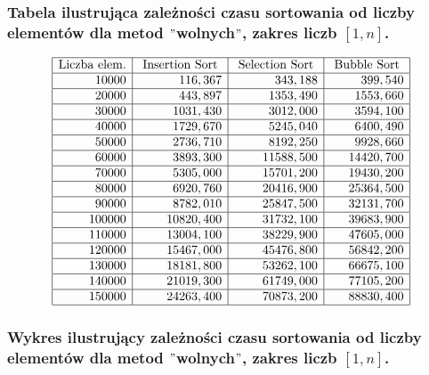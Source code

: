 \documentclass[polish,polish,a4paper]{article}
\begin{document}
\begin{spacing}{1.5}
	\subsubsection*{Tabela ilustrująca zależności czasu sortowania od liczby elementów dla metod $"$wolnych$"$, zakres liczb $ [1,n] $.}
	
	\begin{figure}[H]
			\begin{equation*}
		\begin{array}{|r|r|r|r|}
		\hline
		\multicolumn{1}{|c|}{$Liczba elem.$}&\multicolumn{1}{c|}{$ Insertion Sort $}&\multicolumn{1}{c|}{$ Selection Sort $}&\multicolumn{1}{c|}{$ Bubble Sort $}\\\hline
		10000&	116,367&	343,188&	399,540\\\hline
		20000&	443,897&	1353,490&	1553,660\\\hline
		30000&	1031,430&	3012,000&	3594,100\\\hline
		40000&	1729,670&	5245,040&	6400,490\\\hline
		50000&	2736,710&	8192,250&	9928,660\\\hline
		60000&	3893,300&	11588,500&	14420,700\\\hline
		70000&	5305,000&	15701,200&	19430,200\\\hline
		80000&	6920,760&	20416,900&	25364,500\\\hline
		90000&	8782,010&	25847,500&	32131,700\\\hline
		100000&	10820,400&	31732,100&	39683,900\\\hline
		110000&	13004,100&	38229,900&	47605,000\\\hline
		120000&	15467,000&	45476,800&	56842,200\\\hline
		130000&	18181,800&	53262,100&	66675,100\\\hline
		140000&	21019,300&	61749,000&	77105,200\\\hline
		150000&	24263,400&	70873,200&	88830,400\\
		\hline
		\end{array}
		\end{equation*}
	\end{figure}
	
	\subsubsection*{Wykres ilustrujący zależności czasu sortowania od liczby elementów dla metod $"$wolnych$"$, zakres liczb $ [1,n] $.}
	

\end{spacing}
\end{document}
